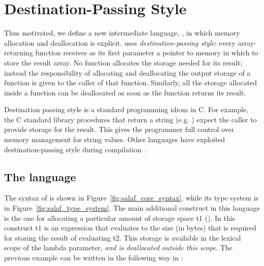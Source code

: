 \section{Destination-Passing Style}
\label{sec:salafsharp}




Thus motivated, we define a new intermediate language, \salafsharp{}, in which memory
allocation and deallocation is explicit.  \salafsharp{} uses
\emph{destination-passing style}: every array-returning function receives as its first parameter a pointer to memory in which to store the result array.
No function  allocates the storage needed for its result; instead the responsibility of allocating
and deallocating the output storage of a function is  given to the caller of that function. Similarly, all the storage allocated inside a function can be deallocated as soon as the function returns its result. 

Destination passing style is a standard programming idiom in C.  For example, the C standard library procedures that return a string (e.g. ) expect the caller to provide storage for the result. This gives the programmer full control over memory management for string values. Other languages have exploited destination-passing style during compilation~\cite{Henriksen:2014:SSH:2636228.2636238, Henriksen:2014:BCI:2627373.2627388}.



\subsection{The \salafsharp{} language}

The syntax of \salafsharp{} is shown in Figure~\ref{fig:salaf_core_syntax}, while its type system is in Figure~\ref{fig:salaf_type_system}. 
The main additional construct in this language is the one for allocating a particular amount of storage space \vallocterm{} t1 (). In this construct
t1 is an expression that evaluates to the size (in bytes) that is required for storing
the result of evaluating t2. This storage is available in the lexical scope of the 
lambda parameter, \emph{and is deallocated outside this scope}. 
The previous example can be written in the following way in \salafsharp{}:


